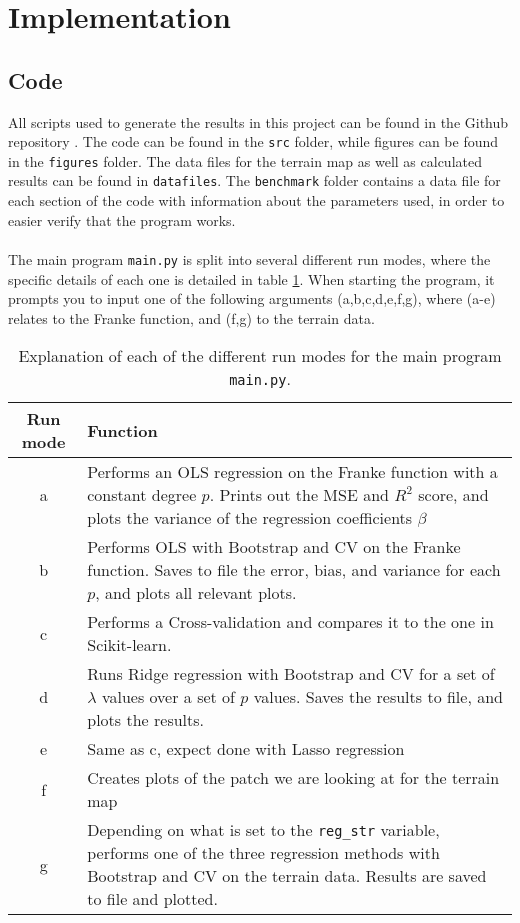 \documentclass[a4paper]{article}
\begin{document}
\section{Implementation} \label{chap:implement}
\subsection{Code}
All scripts used to generate the results in this project can be found in the Github repository \cite{Github1}. The code can be found in the \texttt{src} folder, while figures can be found in the \texttt{figures} folder. The data files for the terrain map as well as calculated results can be found in \texttt{datafiles}. The \texttt{benchmark} folder contains a data file for each section of the code with information about the parameters used, in order to easier verify that the program works.
\\\\
The main program \texttt{main.py} is split into several different run modes, where the specific details of each one is detailed in table \ref{tab:run_modes}. When starting the program, it prompts you to input one of the following arguments (a,b,c,d,e,f,g), where (a-e) relates to the Franke function, and (f,g) to the terrain data.
\begin{table}[H]
  \centering
  \caption{Explanation of each of the different run modes for the main program \texttt{main.py}.}
  \label{tab:run_modes}
  \begin{tabular}{c|p{12cm}}
    \textbf{Run mode} & \textbf{Function}\\\hline
    a & Performs an OLS regression on the Franke function with a constant degree $p$. Prints out the MSE and $R^2$ score, and plots the variance of the regression coefficients $\beta$\\\hline
    b & Performs OLS with Bootstrap and CV on the Franke function. Saves to file the error, bias, and variance for each $p$, and plots all relevant plots.\\\hline
    c & Performs a Cross-validation and compares it to the one in Scikit-learn.\\\hline
    d & Runs Ridge regression with Bootstrap and CV for a set of $\lambda$ values over a set of $p$ values. Saves the results to file, and plots the results.\\\hline
    e & Same as c, expect done with Lasso regression\\\hline
    f & Creates plots of the patch we are looking at for the terrain map\\\hline
    g & Depending on what is set to the \texttt{reg\_str} variable, performs one of the three regression methods with Bootstrap and CV on the terrain data. Results are saved to file and plotted.
    \end{tabular}
\end{table}
\end{document}
